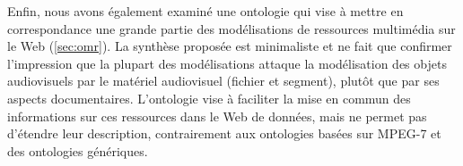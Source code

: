Enfin, nous avons également examiné une ontologie qui vise à mettre en correspondance une grande partie des modélisations de ressources multimédia sur le Web (\ref{sec:omr}).
La synthèse proposée est minimaliste et ne fait que confirmer l'impression que la plupart des modélisations attaque la modélisation des objets audiovisuels par le matériel audiovisuel (fichier et segment), plutôt que par ses aspects documentaires.
L'ontologie vise à faciliter la mise en commun des informations sur ces ressources dans le Web de données, mais ne permet pas d'étendre leur description, contrairement aux ontologies basées sur MPEG-7 et des ontologies génériques.






